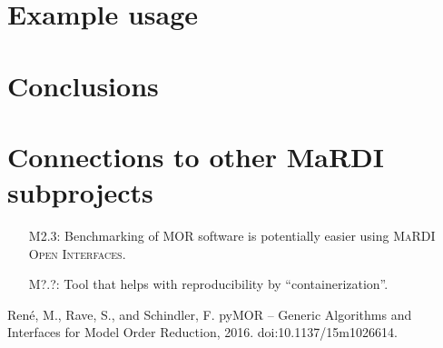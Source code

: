 \documentclass{mmposter}
\newcommand{\OIF}{\textsc{MaRDI Open Interfaces}\xspace}
\begin{document}
\newpage

\section*{Example usage}
\lipsum[2]

\section*{Conclusions}
\lipsum[3]

\section*{Connections to other MaRDI subprojects}

\begin{itemize}[align=left]
  \item[\color{CEmphasis1}M2.3:] Benchmarking of MOR software is potentially
    easier using \OIF{}.
  \item[\color{CEmphasis1}M?.?:] Tool that helps with reproducibility
    by ``containerization''.
\end{itemize}

\begin{thebibliography}{1}
  \setlength{\itemsep}{1pt}
  \setlength{\parskip}{1.5pt}

  \scriptsize{

  Ren{\'{e}}, M., Rave, S., and Schindler, F.
  \newblock pyMOR -- Generic Algorithms and Interfaces for Model Order Reduction, 2016.
  \newblock doi:10.1137/15m1026614.
  }
\end{thebibliography}
\end{document}
